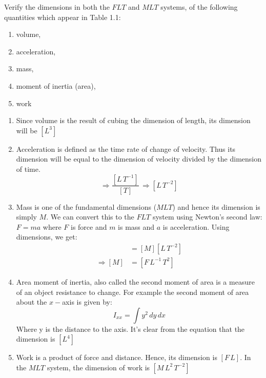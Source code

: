 
\begin{question}
  Verify the dimensions in both the $FLT$ and $MLT$ systems, of the
  following quantities which appear in Table 1.1:
  \begin{enumerate}[label=\alph*)]
  \item volume,
  \item acceleration,
  \item mass,
  \item moment of inertia (area),
  \item work
  \end{enumerate}
\end{question}
\begin{solution}
  \begin{enumerate}[label=\alph*)]
  \item Since volume is the result of cubing the dimension of length,
    its dimension will be $\displaystyle [L^3]$
  \item Acceleration is defined as the time rate of change of
    velocity. Thus its dimension will be equal to the dimension of
    velocity divided by the dimension of time.
    \begin{equation*}
      \Rightarrow \frac{[L\,T^{-1}]}{[T]}\,\Rightarrow [L\,T^{-2}]
    \end{equation*}
  \item Mass is one of the fundamental dimensions ($MLT$) and hence its
    dimension is simply $M$. We can convert this to the $FLT$ system
    using Newton's second law: $F = ma$ where $F$ is force and $m$ is
    mass and $a$ is acceleration. Using dimensions, we get:
    \begin{align*}
      [F] &= [M][L\,T^{-2}] \\
      \Rightarrow [M] &= [F\,L^{-1}\,T^2]
    \end{align*}
  \item Area moment of inertia, also called the second moment of
    area is a measure of an object resistance to change. For example
    the second moment of area about the $x-$axis is given by:
    \begin{equation*}
      I_{xx} = \int y^2 \,dy\,dx
    \end{equation*}
    Where y is the distance to the axis. It's clear from the
    equation that the dimension is $\displaystyle [L^4]$
  \item Work is a product of force and distance. Hence, its dimension
    is $[F\,L]$. In the $MLT$ system, the dimension of work is $[M\,L^2\,T^{-2}]$
  \end{enumerate}
\end{solution}


